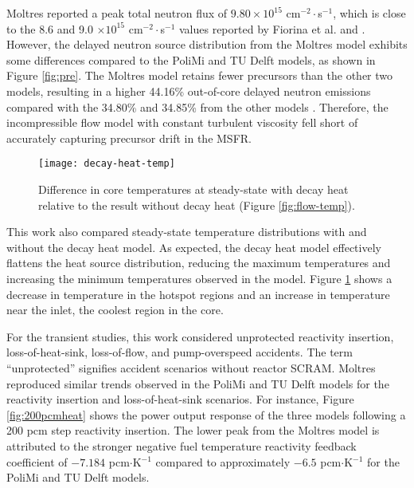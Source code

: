 Moltres reported a peak total neutron flux of $9.80 \times 10^{15}$
cm$^{-2}\cdot$s$^{-1}$, which is close to the 8.6 and 9.0 $\times 10^{15}$
cm$^{-2}\cdot$s$^{-1}$ values reported by Fiorina et al.
\cite{fiorina_molten_2013} and \cite{aufiero_development_2014}. However, the
delayed neutron source distribution from the Moltres model exhibits some
differences compared to the PoliMi and TU Delft models, as shown in Figure
\ref{fig:pre}. The Moltres model retains fewer precursors than the other two
models, resulting in a higher 44.16\% out-of-core delayed neutron emissions
compared with the 34.80\% and 34.85\% from the other models
\cite{park_advancement_2020}. Therefore, the incompressible flow model with
constant turbulent viscosity fell short of accurately capturing precursor
drift in the \gls{MSFR}.

\begin{figure}[htb]
    \centering
    \texttt{[image: decay-heat-temp]}
    \caption{Difference in core temperatures at steady-state with decay heat
    relative to the result without decay heat (Figure \ref{fig:flow-temp}).}
    \label{fig:decayheattemp}
\end{figure}

This work also compared steady-state temperature distributions with and without
the decay heat model. As expected, the decay heat model effectively flattens
the heat source distribution, reducing the maximum
temperatures and increasing the minimum temperatures observed in the model.
Figure \ref{fig:decayheattemp} shows a decrease in temperature in the hotspot
regions and an increase in temperature near the inlet, the coolest
region in the core.

For the transient studies, this work considered unprotected reactivity
insertion, loss-of-heat-sink, loss-of-flow, and pump-overspeed accidents. The
term ``unprotected'' signifies accident scenarios without reactor SCRAM.
Moltres reproduced similar trends observed in the PoliMi and TU Delft
models for the reactivity insertion and loss-of-heat-sink scenarios. For
instance, Figure \ref{fig:200pcmheat} shows the power output response of the
three models following a 200 pcm step reactivity insertion. The lower peak from
the Moltres model is attributed to the stronger negative fuel temperature
reactivity feedback coefficient of $-7.184$ pcm$\cdot$K$^{-1}$ compared to
approximately $-6.5$ pcm$\cdot$K$^{-1}$ for the PoliMi and TU Delft models.

